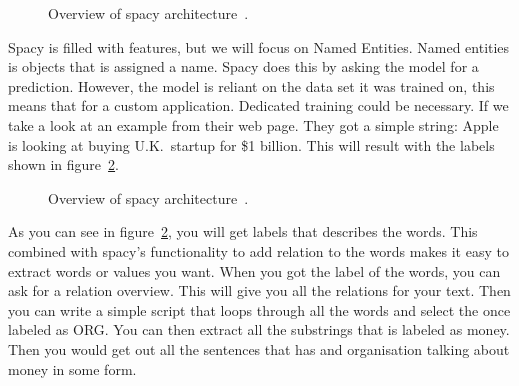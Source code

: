 \begin{figure}[h]
    \caption{Overview of spacy architecture~\cite{spaCy101}.}
    \label{fig:architecture}
\end{figure}

Spacy is filled with features, but we will focus on Named Entities.
Named entities is objects that is assigned a name.
Spacy does this by asking the model for a prediction.
However, the model is reliant on the data set it was trained on, this means that for a custom application.
Dedicated training could be necessary.
If we take a look at an example from their web page.
They got a simple string: Apple is looking at buying U.K.\ startup for \$1 billion.
This will result with the labels shown in figure~\ref{fig:Spacy labels}.

\begin{figure}[h]
    \caption{Overview of spacy architecture~\cite{spaCy101}.}
    \label{fig:Spacy labels}
\end{figure}

As you can see in figure~\ref{fig:Spacy labels}, you will get labels that describes the words.
This combined with spacy's functionality to add relation to the words makes it easy to extract words or values you want.
When you got the label of the words, you can ask for a relation overview.
This will give you all the relations for your text.
Then you can write a simple script that loops through all the words and select the once labeled as ORG. You can then
extract all the substrings that is labeled as money.
Then you would get out all the sentences that has and organisation talking about money in some form. 







